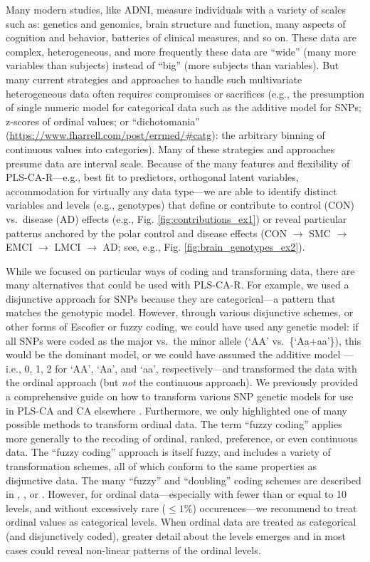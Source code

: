 \documentclass[12pt]{article}
\begin{document}
\label{section:Disc}

Many modern studies, like ADNI, measure individuals with a variety of
scales such as: genetics and genomics, brain structure and function,
many aspects of cognition and behavior, batteries of clinical measures,
and so on. These data are complex, heterogeneous, and more frequently
these data are ``wide'' (many more variables than subjects) instead of
``big'' (more subjects than variables). But many current strategies and
approaches to handle such multivariate heterogeneous data often requires
compromises or sacrifices (e.g., the presumption of single numeric model
for categorical data such as the additive model for SNPs; z-scores of
ordinal values; or ``dichotomania''
(\url{https://www.fharrell.com/post/errmed/\#catg}): the arbitrary
binning of continuous values into categories). Many of these strategies
and approaches presume data are interval scale. Because of the many
features and flexibility of PLS-CA-R---e.g., best fit to predictors,
orthogonal latent variables, accommodation for virtually any data
type---we are able to identify distinct variables and levels (e.g.,
genotypes) that define or contribute to control (CON) vs.~disease (AD)
effects (e.g., Fig. \ref{fig:contributions_ex1}) or reveal particular
patterns anchored by the polar control and disease effects (CON
\(\rightarrow\) SMC \(\rightarrow\) EMCI \(\rightarrow\) LMCI
\(\rightarrow\) AD; see, e.g., Fig. \ref{fig:brain_genotypes_ex2}).

While we focused on particular ways of coding and transforming data,
there are many alternatives that could be used with PLS-CA-R. For
example, we used a disjunctive approach for SNPs because they are
categorical---a pattern that matches the genotypic model. However,
through various disjunctive schemes, or other forms of Escofier or fuzzy
coding, we could have used any genetic model: if all SNPs were coded as
the major vs.~the minor allele (`AA' vs.~\{`Aa+aa'\}), this would be the
dominant model, or we could have assumed the additive model ---i.e., 0,
1, 2 for `AA', `Aa', and `aa', respectively---and transformed the data
with the ordinal approach (but \emph{not} the continuous approach). We
previously provided a comprehensive guide on how to transform various
SNP genetic models for use in PLS-CA and CA elsewhere \citep[see
Appendix of][]{beaton_partial_2016}. Furthermore, we only highlighted
one of many possible methods to transform ordinal data. The term ``fuzzy
coding'' applies more generally to the recoding of ordinal, ranked,
preference, or even continuous data. The ``fuzzy coding'' approach is
itself fuzzy, and includes a variety of transformation schemes, all of
which conform to the same properties as disjunctive data. The many
``fuzzy'' and ``doubling'' coding schemes are described in
\citet{escofier_traitement_1979}, \citet{lebart_multivariate_1984}, or
\citet{greenacrefuzzy}. However, for ordinal data---especially with
fewer than or equal to 10 levels, and without excessively rare
(\(\leq 1\)\%) occurences---we recommend to treat ordinal values as
categorical levels. When ordinal data are treated as categorical (and
disjunctively coded), greater detail about the levels emerges and in
most cases could reveal non-linear patterns of the ordinal levels.
\end{document}
